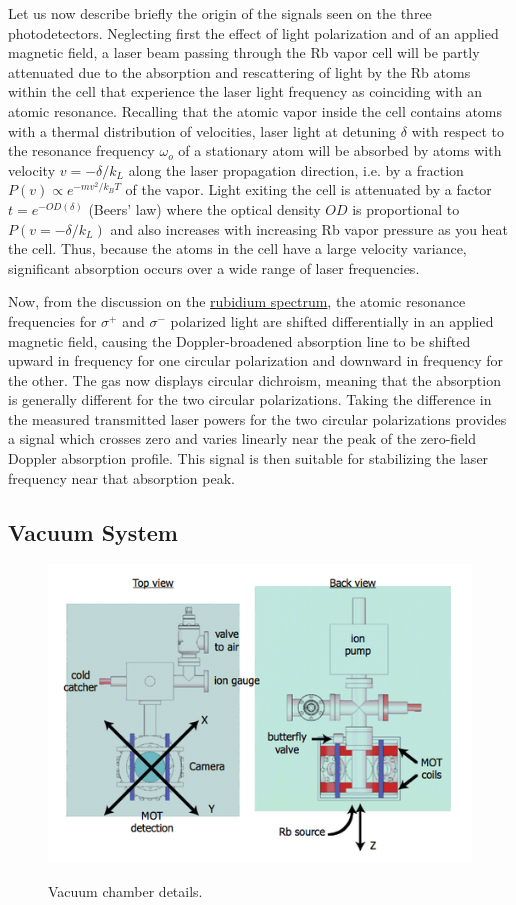 \documentclass{../lab}
\begin{document}
Let us now describe briefly the origin of the signals seen on the three photodetectors. Neglecting first the effect of light polarization and of an applied magnetic field, a laser beam passing through the Rb vapor cell will be partly attenuated due to the absorption and rescattering of light by the Rb atoms within the cell that experience the laser light frequency as coinciding with an atomic resonance. Recalling that the atomic vapor inside the cell contains atoms with a thermal distribution of velocities, laser light at detuning $\delta$ with respect to the resonance frequency $\omega_o$ of a stationary atom will be absorbed by atoms with velocity $ v = -\delta/k_L$ along the laser propagation direction, i.e. by a fraction $ P(v) \propto  e^{-m v^2/k_B T}$ of the vapor. Light exiting the cell is attenuated by a factor $ t = e^{-OD(\delta)}$ (Beers’ law) where the optical density $ OD$ is proportional to $P(v = -\delta / k_L)$ and also increases with increasing Rb vapor pressure as you heat the cell. Thus, because the atoms in the cell have a large velocity variance, significant absorption occurs over a wide range of laser frequencies.

Now, from the discussion on the \hyperref[subsubsec:RubidiumSpectrum]{rubidium spectrum}, the atomic resonance frequencies for $\sigma^+ $ and $\sigma^- $ polarized light are shifted differentially in an applied magnetic field, causing the Doppler-broadened absorption line to be shifted upward in frequency for one circular polarization and downward in frequency for the other. The gas now displays circular dichroism, meaning that the absorption is generally different for the two circular polarizations. Taking the difference in the measured transmitted laser powers for the two circular polarizations provides a signal which crosses zero and varies linearly near the peak of the zero-field Doppler absorption profile. This signal is then suitable for stabilizing the laser frequency near that absorption peak.

\subsection{Vacuum System}

\begin{figure}[h]
    \centering
    \href{http://experimentationlab.berkeley.edu/sites/default/files/images/500px-MOTimage008.png}{\includegraphics[width=0.5\linewidth]{images/500px-MOTimage008.png}}
    \caption{Vacuum chamber details.}
    \label{fig:VacuumChamberDetails}
\end{figure}
\end{document}
